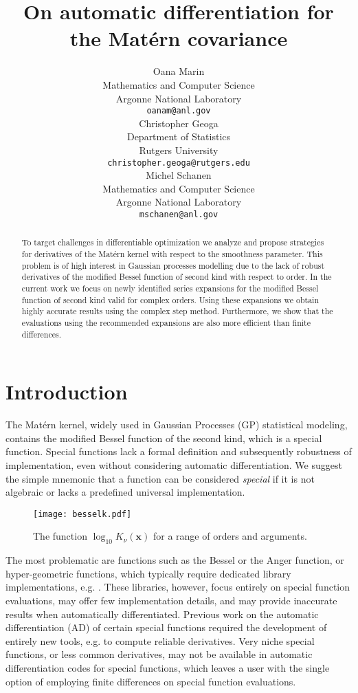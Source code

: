 \documentclass{article}
\title{On automatic differentiation for the Mat\'ern covariance}
\author{%
Oana Marin\\
 Mathematics and Computer Science\\
  Argonne National Laboratory\\
   \texttt{oanam@anl.gov} \\
\And 
Christopher Geoga\\
Department of Statistics\\
Rutgers University\\
\texttt{christopher.geoga@rutgers.edu}\\
\And 
Michel Schanen\\
 Mathematics and Computer Science\\
  Argonne National Laboratory\\
   \texttt{mschanen@anl.gov} 
}
\begin{document}
\maketitle

\begin{abstract}
To target challenges in differentiable optimization we analyze and propose strategies for derivatives of the Mat\'ern kernel with respect to the smoothness parameter. This problem is of high interest in Gaussian processes modelling due to the lack of robust derivatives of the modified Bessel function of second kind with respect to order. 
In the current work we focus on newly identified series expansions for the modified Bessel function of second kind valid for complex orders. Using these expansions we obtain highly accurate results using the complex step method. Furthermore, we show that the evaluations using the recommended expansions are also more efficient than finite differences.
\end{abstract}

\section{Introduction}
The Mat\'ern kernel, widely used in Gaussian Processes (GP) statistical modeling, contains the modified Bessel function of the second kind, which is a special function. Special functions lack a formal definition and subsequently  robustness of implementation, even without considering automatic differentiation. We suggest the simple mnemonic that a function can be considered \emph{special} if it is not algebraic or lacks a predefined universal implementation. 
\begin{wrapfigure}[15]{r}{0.5\textwidth}
   \texttt{[image: besselk.pdf]}
   \centering
   \captionsetup{margin=1cm}
  \caption{The function $\log_{10}K_{\nu}(\bm{x})$ for a range of orders and arguments.\label{fig:besselk}}
\end{wrapfigure}  
The most problematic are functions such as the Bessel or the Anger function, or hyper-geometric functions, which typically require dedicated library implementations, e.g. \cite{amos1983a,cody1976}. These libraries, however, focus entirely on special function evaluations, may offer few implementation details, and may provide inaccurate results when automatically differentiated. Previous work on the automatic differentiation (AD) of certain special functions required the development of entirely new tools, e.g. \cite{charpentier2015, charpentier2018} to compute reliable derivatives. Very niche special functions, or less common derivatives, may not be available in automatic differentiation codes for special functions, which leaves a user with the single option of employing finite differences on special function evaluations.
\end{document}
